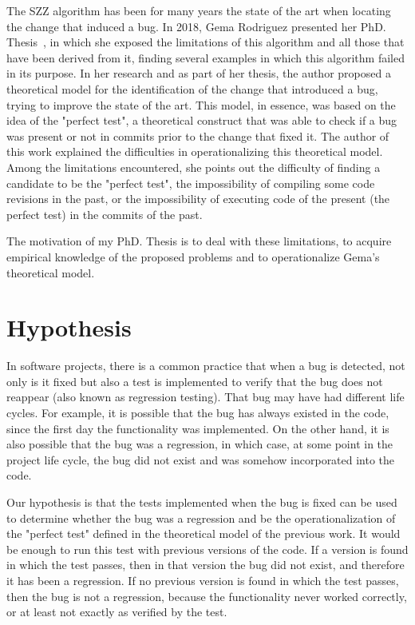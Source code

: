 The SZZ algorithm has been for many years the state of the art when locating the change that induced a bug. 
In 2018, Gema Rodriguez presented her PhD. Thesis~\cite{rodriguez2018towards}, in which she exposed the limitations of this algorithm and all those that have been derived from it, finding several examples in which this algorithm failed in its purpose. 
In her research and as part of her thesis, the author proposed a theoretical model for the identification of the change that introduced a bug, trying to improve the state of the art. 
This model, in essence, was based on the idea of the "perfect test", a theoretical construct that was able to check if a bug was present or not in commits prior to the change that fixed it. The author of this work explained the difficulties in operationalizing this theoretical model. 
Among the limitations encountered, she points out the difficulty of finding a candidate to be the "perfect test", the impossibility of compiling some code revisions in the past, or the impossibility of executing code of the present (the perfect test) in the commits of the past.

The motivation of my PhD. Thesis is to deal with these limitations, to acquire empirical knowledge of the proposed problems and to operationalize Gema's theoretical model.

\section{Hypothesis}

In software projects, there is a common practice that when a bug is detected, not only is it  fixed but also a test is implemented to verify that the bug does not reappear (also known as regression testing). 
That bug may have had different life cycles. 
For example, it is possible that the bug has always existed in the code, since the first day the functionality was implemented. 
On the other hand, it is also possible that the bug was a regression, in which case, at some point in the project life cycle, the bug did not exist and was somehow incorporated into the code. 

Our hypothesis is that the tests implemented when the bug is fixed can be used to determine whether the bug was a regression and be  the operationalization of the "perfect test" defined in the theoretical model of the previous work. 
It would be enough to run this test with previous versions of the code. 
If a version is found in which the test passes, then in that version the bug did not exist, and therefore it has been a regression. 
If no previous version is found in which the test passes, then the bug is not a regression, because the functionality never worked correctly, or at least not exactly as verified by the test.

